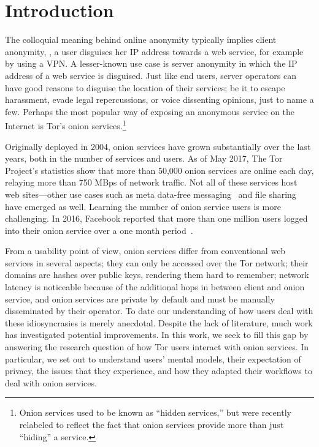 \section{Introduction}
\label{sec:introduction}

The colloquial meaning behind online anonymity typically implies client
anonymity, \ie, a user disguises her IP address towards a web service, for
example by using a VPN.  A lesser-known use case is server anonymity in which
the IP address of a web service is disguised.  Just like end users, server
operators can have good reasons to disguise the location of their services; be
it to escape harassment, evade legal repercussions, or voice dissenting
opinions, just to name a few.  Perhaps the most popular way of exposing an
anonymous service on the Internet is Tor's onion services.\footnote{Onion
services used to be known as ``hidden services,'' but were recently relabeled to
reflect the fact that onion services provide more than just ``hiding'' a
service.}

Originally deployed in 2004, onion services have grown substantially over the
last years, both in the number of services and users.  As of May 2017, The Tor
Project's statistics show that more than 50,000 onion services are online each
day, relaying more than 750 MBps of network traffic.  Not all of these services
host web sites---other use cases such as meta data-free
messaging~\cite{ricochet} and file sharing~\cite{onionshare} have emerged as
well.  Learning the number of onion service users is more challenging.  In 2016,
Facebook reported that more than one million users logged into their onion
service over a one month period~\cite{facebook-users}.

From a usability point of view, onion services differ from conventional web
services in several aspects; \first they can only be accessed over the Tor
network; \second their domains are hashes over public keys, rendering them hard
to remember; \third network latency is noticeable because of the additional hops
in between client and onion service, and \fourth onion services are private by
default and must be manually disseminated by their operator. To date our
understanding of how users deal with these idiosyncrasies is merely anecdotal.
Despite the lack of literature, much work has investigated potential
improvements.  In this work, we seek to fill this gap by answering the research
question of how Tor users interact with onion services.  In particular, we set
out to understand users' mental models, their expectation of privacy, the issues
that they experience, and how they adapted their workflows to deal with onion
services.

